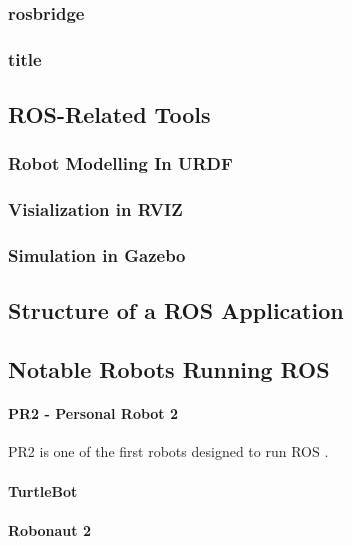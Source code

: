 \subsubsection{rosbridge}

\subsubsection{title}

\subsection{ROS-Related Tools}

\subsubsection{Robot Modelling In URDF}

\subsubsection{Visialization in RVIZ}

\subsubsection{Simulation in Gazebo}

\subsection{Structure of a ROS Application}

\subsection{Notable Robots Running ROS}

\paragraph{PR2 - Personal Robot 2}

PR2 is one of the first robots designed to run \ac{ROS} \cite{rosbook15}.

\paragraph{TurtleBot} 

\paragraph{Robonaut 2}

